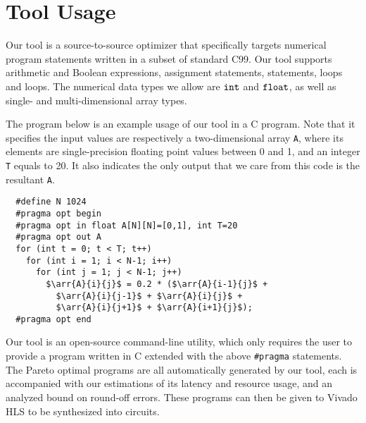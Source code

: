 \section{Tool Usage}
\label{lo:sec:usage}


Our tool is a source-to-source optimizer that specifically targets numerical
program statements written in a subset of standard C99.  Our tool
supports arithmetic and Boolean expressions, assignment statements, \iflit{}
statements, \whilelit{} loops and \forlit{} loops.  The numerical data types we
allow are $\texttt{int}$ and $\texttt{float}$, as well as single- and multi-dimensional
array types.

The program below is an example usage of our tool in a C program.  Note
that it specifies the input values are respectively a two-dimensional array
\verb|A|, where its elements are single-precision floating point values between
0 and 1, and an integer \verb|T| equals to 20.  It also indicates the only
output that we care from this code is the resultant \verb|A|.
\begin{lstlisting}
  #define N 1024
  #pragma opt begin
  #pragma opt in float A[N][N]=[0,1], int T=20
  #pragma opt out A
  for (int t = 0; t < T; t++)
    for (int i = 1; i < N-1; i++)
      for (int j = 1; j < N-1; j++)
        $\arr{A}{i}{j}$ = 0.2 * ($\arr{A}{i-1}{j}$ +
          $\arr{A}{i}{j-1}$ + $\arr{A}{i}{j}$ +
          $\arr{A}{i}{j+1}$ + $\arr{A}{i+1}{j}$);
  #pragma opt end
\end{lstlisting}

Our tool is an open-source command-line utility, which only requires the user
to provide a program written in C extended with the above \verb|#pragma|
statements.  The Pareto optimal programs are all automatically generated by
our tool, each is accompanied with our estimations of its latency and resource
usage, and an analyzed bound on round-off errors.  These programs can then be
given to Vivado HLS to be synthesized into circuits.
